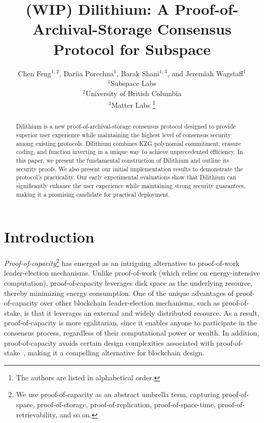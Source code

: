 \documentclass[conference]{IEEEtran}
\title{(WIP) Dilithium: A Proof-of-Archival-Storage Consensus Protocol for Subspace}
\author{Chen Feng$^{1,}$$^{ 2}$, Dariia Porechna$^{1}$, Barak Shani$^{1,}$$^{ 3}$, and Jeremiah Wagstaff$^{1}$\\
$^1$Subspace Labs\\
$^2$University of British Columbia\\
$^3$Matter Labs
\thanks{The authors are listed in alphabetical order.}}
\begin{document}
\maketitle

\begin{abstract}
    Dilithium is a new proof-of-archival-storage consensus protocol designed to provide superior
    user experience while maintaining the highest level 
    of consensus security among existing protocols.
    Dilithium combines KZG polynomial commitment, erasure coding, and function inverting
    in a unique way to achieve unprecedented efficiency. 
    In this paper, we present the fundamental construction of Dilithium
    and outline its security proofs. We also present our initial implementation results to demonstrate the protocol's practicality.
    Our early experimental evaluations show that Dilithium can significantly enhance the user experience while maintaining strong security guarantees, making it a promising candidate for practical deployment.
\end{abstract}

\section{Introduction}

\textit{Proof-of-capacity}\footnote{We use proof-of-capacity as an abstract umbrella term, capturing proof-of-space, proof-of-storage, proof-of-replication, proof-of-space-time, proof-of-retrievability, and so on.} has emerged as an intriguing alternative to proof-of-work leader-election mechanisms. 
Unlike proof-of-work (which relies on energy-intensive computation), 
proof-of-capacity leverages disk space as the underlying resource,
thereby minimizing energy consumption. 
One of the unique advantages of proof-of-capacity over other blockchain leader-election mechanisms, such as proof-of-stake, is that it leverages an external and widely distributed resource. As a result, proof-of-capacity is more egalitarian, since it enables anyone to participate in the consensus process, regardless of their computational power or wealth.
In addition, proof-of-capacity avoids 
certain design complexities associated with proof-of-stake~\cite{blockchain_resources}, making it a compelling alternative for blockchain design.
\end{document}
